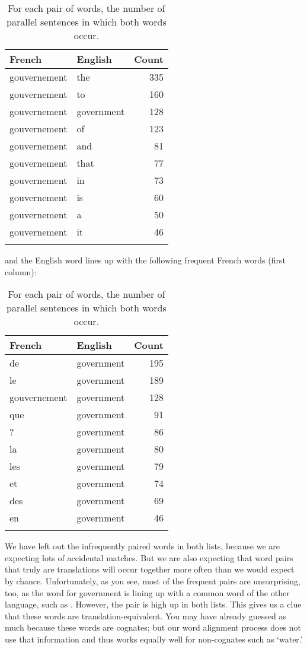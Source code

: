 \begin{table}
\begin{tabular}{llr}
\lsptoprule
French & English & Count \\ \midrule
gouvernement & the & 335 \\
gouvernement & to  &160  \\
gouvernement & government & 128 \\
gouvernement & of & 123  \\
gouvernement & and & 81  \\
gouvernement & that & 77 \\
gouvernement & in & 73 \\
gouvernement & is & 60 \\
gouvernement & a & 50 \\
gouvernement & it & 46 \\
\lspbottomrule
\end{tabular}
\caption{For each pair of words, the number of parallel sentences in which both words occur.}
\end{table}
and the English word  lines up with the following frequent French words (first column):

\begin{table}
\begin{tabular}{llr}
\lsptoprule
French & English & Count \\ \midrule
de & government & 195 \\
le & government & 189 \\
gouvernement & government & 128 \\
que & government & 91 \\
? & government & 86 \\
la & government & 80 \\
les & government & 79 \\
et & government & 74 \\
des & government & 69 \\
en & government & 46	\\
\lspbottomrule
\end{tabular}
\caption{For each pair of words, the number of parallel sentences in which both words occur.}
\end{table}

We have left out the infrequently paired words in both lists, because we are expecting lots of accidental matches.  But we are also expecting that word pairs that truly are translations will occur together more often than we would expect by chance.  Unfortunately, as
you see, most of the frequent pairs are unsurprising, too, as the word for government is lining up with a common word of the other language, such as .  However, the pair  is high up in both lists.  This gives us a clue that these words are translation-equivalent.  You may have already guessed as much because these words are cognates; but our word alignment process does not use that information and thus works equally well for non-cognates such as  `water.'


